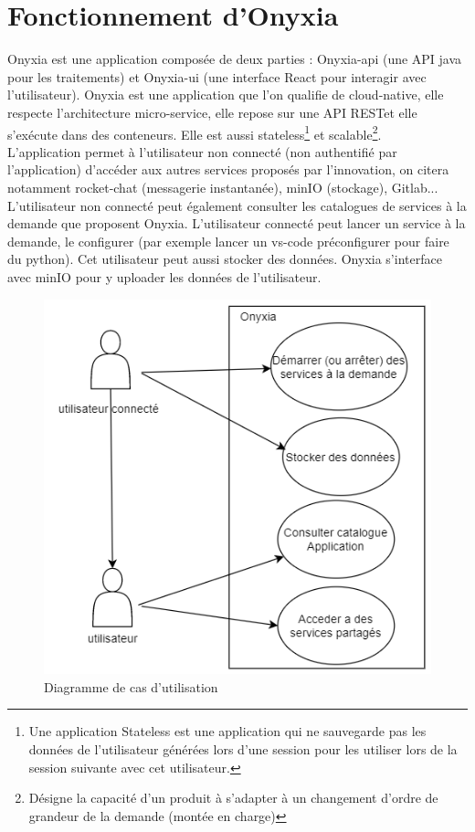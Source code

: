 \documentclass[11pt,fleqn]{book} %
\begin{document}
\section{Fonctionnement d'Onyxia}
Onyxia est une application composée de deux parties : Onyxia-api (une API java pour les traitements) et Onyxia-ui (une interface React pour interagir avec l'utilisateur). Onyxia est une application que l'on qualifie de cloud-native, elle respecte l'architecture micro-service, elle repose sur une API RESTet elle s'exécute dans des conteneurs. Elle est aussi stateless\footnote{Une application Stateless est une application qui ne sauvegarde pas les données de l'utilisateur générées lors d'une session pour les utiliser lors de la session suivante avec cet utilisateur.} et scalable\footnote{Désigne la capacité d'un produit à s'adapter à un changement d'ordre de grandeur de la demande (montée en charge)}.\\


L'application permet à l'utilisateur non connecté (non authentifié par l'application) d'accéder aux autres services proposés par l'innovation, on citera notamment rocket-chat (messagerie instantanée), minIO (stockage), Gitlab... L'utilisateur non connecté peut également consulter les catalogues de services à la demande que proposent Onyxia. L'utilisateur connecté peut lancer un service à la demande, le configurer (par exemple lancer un vs-code préconfigurer pour faire du python). Cet utilisateur peut aussi stocker des données. Onyxia s'interface avec minIO pour y uploader les données de l'utilisateur.\\
\begin{figure}
    \renewcommand{\figurename}{Diagramme}
    \includegraphics[scale=0.7]{Pictures/onyxia/onyxia-cu.PNG}
    \caption[]{Diagramme de cas d'utilisation \newline}
\end{figure}
\end{document}
